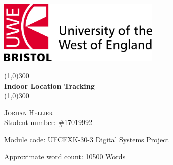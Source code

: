 \begin{titlepage}

		\includegraphics[height=3cm]{./images/uwe_logo.jpg}
		\vspace{25mm}

	\begin{center}
		\line(1,0){300}\\
		[5mm]
		\huge{\bfseries Indoor Location Tracking}\\
		[2mm]
		\line(1,0){300}\\
		[7cm]
	\end{center}
	\begin{flushright}
	\textsc{\Large Jordan Hellier}\\
	Student number: \#17019992\\
	[1cm]
	\end{flushright}
	\begin{flushright}
		Module code: UFCFXK-30-3 Digital Systems Project
	\end{flushright}
	\begin{flushright}
		Approximate word count: 10500 Words
	\end{flushright}


\end{titlepage}
